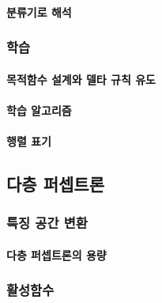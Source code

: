 \documentclass [12pt] {oblivoir}
\let\oldsubsubsection=\subsubsection
\renewcommand{\subsubsection}
{
  \filbreak
  \oldsubsubsection
}
\begin{document}
\vspace{3mm}

\paragraph*{분류기로 해석}\mbox{}

\vspace{3mm}

\subsubsection{학습}

\paragraph*{목적함수 설계와 델타 규칙 유도}\mbox{}

\vspace{3mm}

\paragraph*{학습 알고리즘}\mbox{}

\vspace{3mm}

\paragraph*{행렬 표기}\mbox{}

\vspace{3mm}

\subsection{다층 퍼셉트론}

\subsubsection{특징 공간 변환}

\paragraph*{다층 퍼셉트론의 용량}\mbox{}

\vspace{3mm}

\subsubsection{활성함수}
\end{document}

